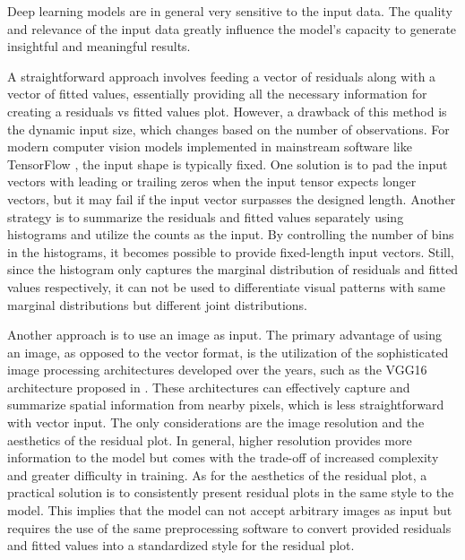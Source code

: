 \documentclass[]{interact}
\theoremstyle{plain}%
\theoremstyle{definition}
\theoremstyle{remark}
\begin{document}
Deep learning models are in general very sensitive to the input data.
The quality and relevance of the input data greatly influence the
model's capacity to generate insightful and meaningful results.

A straightforward approach involves feeding a vector of residuals along
with a vector of fitted values, essentially providing all the necessary
information for creating a residuals vs fitted values plot. However, a
drawback of this method is the dynamic input size, which changes based
on the number of observations. For modern computer vision models
implemented in mainstream software like TensorFlow
\citep{abadi2016tensorflow}, the input shape is typically fixed. One
solution is to pad the input vectors with leading or trailing zeros when
the input tensor expects longer vectors, but it may fail if the input
vector surpasses the designed length. Another strategy is to summarize
the residuals and fitted values separately using histograms and utilize
the counts as the input. By controlling the number of bins in the
histograms, it becomes possible to provide fixed-length input vectors.
Still, since the histogram only captures the marginal distribution of
residuals and fitted values respectively, it can not be used to
differentiate visual patterns with same marginal distributions but
different joint distributions.

Another approach is to use an image as input. The primary advantage of
using an image, as opposed to the vector format, is the utilization of
the sophisticated image processing architectures developed over the
years, such as the VGG16 architecture proposed in
\citet{simonyan2014very}. These architectures can effectively capture
and summarize spatial information from nearby pixels, which is less
straightforward with vector input. The only considerations are the image
resolution and the aesthetics of the residual plot. In general, higher
resolution provides more information to the model but comes with the
trade-off of increased complexity and greater difficulty in training. As
for the aesthetics of the residual plot, a practical solution is to
consistently present residual plots in the same style to the model. This
implies that the model can not accept arbitrary images as input but
requires the use of the same preprocessing software to convert provided
residuals and fitted values into a standardized style for the residual
plot.
\end{document}
